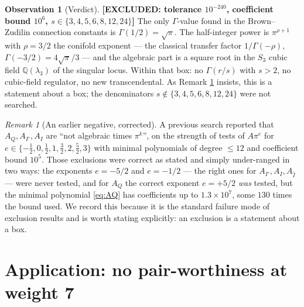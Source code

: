 \documentclass[11pt,reqno]{amsart}
\theoremstyle{plain}
\theoremstyle{definition}
\newtheorem{observation}[theorem]{Observation}
\theoremstyle{remark}
\newtheorem{remark}[theorem]{Remark}
\newcommand{\EXCL}[1]{{\normalfont\sffamily\bfseries[EXCLUDED: #1]}}
\newcommand{\QQ}{\mathbb{Q}}
\newcommand{\Ihat}{\widehat{I}}
\begin{document}
\begin{observation}[Verdict]\label{obs:gammaverdict}
\EXCL{tolerance $10^{-240}$, coefficient bound $10^{6}$, $s\in\{3,4,5,6,8,12,24\}$}
The only $\Gamma$-value found in the Brown--Zudilin connection constants is
$\Gamma(1/2)=\sqrt{\pi}$. The half-integer power is $\pi^{\rho+1}$ with $\rho=3/2$ the conifold
exponent --- the classical transfer factor $1/\Gamma(-\rho)$, $\Gamma(-3/2)=4\sqrt{\pi}/3$ --- and
the algebraic part is a square root in the $S_3$ cubic field $\QQ(\lambda_3)$ of the singular
locus. Within that box: no $\Gamma(r/s)$ with $s>2$, no cubic-field regulator, no new
transcendental. As Remark \ref{rem:underranged} insists, this is a statement about a box; the
denominators $s\notin\{3,4,5,6,8,12,24\}$ were not searched.
\end{observation}

\begin{remark}[An earlier negative, corrected]\label{rem:underranged}
A previous search reported that $A_Q,A_{I'},A_I$ are ``not algebraic times $\pi^k$'', on the
strength of tests of $A\pi^{e}$ for $e\in\{-\tfrac12,0,\tfrac12,1,\tfrac32,2,\tfrac52,3\}$ with
minimal polynomials of degree $\le12$ and coefficient bound $10^5$. Those exclusions were
correct as stated and simply under-ranged in two ways: the exponents $e=-5/2$ and $e=-1/2$ ---
the right ones for $A_{I'},A_I,A_{\Ihat}$ --- were never tested, and for $A_Q$ the correct
exponent $e=+5/2$ \emph{was} tested, but the minimal polynomial \eqref{eq:AQ} has coefficients up
to $1.3\times10^{7}$, some $130$ times the bound used. We record this because it is the standard
failure mode of exclusion results and is worth stating explicitly: an exclusion is a statement
about a box.
\end{remark}

\section{Application: no pair-worthiness at weight 7}\label{sec:weight7}
\end{document}
